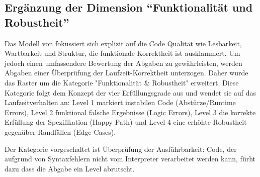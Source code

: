 \subsection{Ergänzung der Dimension \enquote{Funktionalität und Robustheit}}
Das Modell von \parencite{stegeman_designing_2016} fokussiert sich explizit auf die Code Qualität wie Lesbarkeit, Wartbarkeit und Struktur, die funktionale Korrektheit ist ausklammert. Um jedoch einen umfassendere Bewertung der Abgaben zu gewährleisten, werden Abgaben einer Überprüfung der Laufzeit-Korrektheit unterzogen. Daher wurde das Raster um die Kategorie "Funktionalität \& Robustheit" erweitert. Diese Kategorie folgt dem Konzept der vier Erfüllungsgrade aus \parencite{stegeman_designing_2016} und wendet sie auf das Laufzeitverhalten an: Level 1 markiert instabilen Code (Abstürze/Runtime Errors), Level 2 funktional falsche Ergebnisse (Logic Errors), Level 3 die korrekte Erfüllung der Spezifikation (Happy Path) und Level 4 eine erhöhte Robustheit gegenüber Randfällen (Edge Cases).

Der Kategorie vorgeschaltet ist Überprüfung der Ausführbarkeit: Code, der aufgrund von Syntaxfehlern nicht vom Interpreter verarbeitet werden kann, fürht dazu dass die Abgabe ein Level abrutscht.
